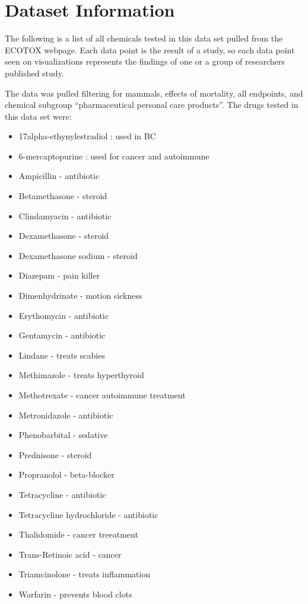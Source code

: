 \documentclass[12pt,]{article}
\providecommand{\tightlist}{%
  \setlength{\itemsep}{0pt}\setlength{\parskip}{0pt}}
\begin{document}
\newpage

\section{Dataset Information}\label{dataset-information}

The following is a list of all chemicals tested in this data set pulled
from the ECOTOX webpage. Each data point is the result of a study, so
each data point seen on visualizations represents the findings of one or
a group of researchers published study.

The data was pulled filtering for mammals, effects of mortality, all
endpoints, and chemical subgroup ``pharmaceutical personal care
products''. The drugs tested in this data set were:

\begin{itemize}
\tightlist
\item
  17alpha-ethynylestradiol : used in BC
\item
  6-mercaptopurine : used for cancer and autoimmune
\item
  Ampicillin - antibiotic
\item
  Betamethasone - steroid
\item
  Clindamyacin - antibiotic
\item
  Dexamethasone - steroid
\item
  Dexamethasone sodium - steroid
\item
  Diazepam - pain killer
\item
  Dimenhydrinate - motion sickness
\item
  Erythomycin - antibiotic
\item
  Gentamycin - antibiotic
\item
  Lindane - treats scabies
\item
  Methimazole - treats hyperthyroid
\item
  Methotrexate - cancer autoimmune treatment
\item
  Metronidazole - antibiotic
\item
  Phenobarbital - sedative
\item
  Prednisone - steroid
\item
  Propranolol - beta-blocker
\item
  Tetracycline - antibiotic
\item
  Tetracycline hydrochloride - antibiotic
\item
  Thalidomide - cancer treeatment
\item
  Trans-Retinoic acid - cancer
\item
  Triamcinolone - treats inflammation
\item
  Warfarin - prevents blood clots
\end{itemize}
\end{document}

